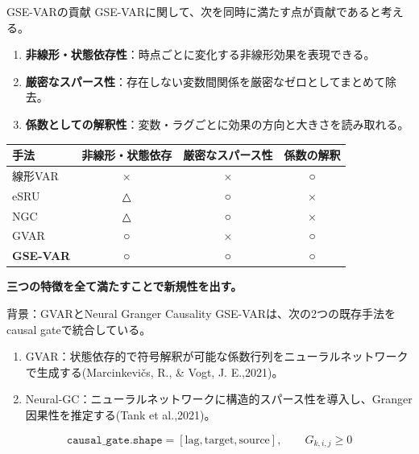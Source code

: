 \documentclass[dvipdfmx,11pt]{beamer}
\begin{document}
\begin{frame}{GSE-VARの貢献}
  \small
  GSE-VARに関して、次を同時に満たす点が貢献であると考える。

  \vspace{0.4em}
  \begin{enumerate}
    \item \textbf{非線形・状態依存性}：時点ごとに変化する非線形効果を表現できる。
    \item \textbf{厳密なスパース性}：存在しない変数間関係を厳密なゼロとしてまとめて除去。
    \item \textbf{係数としての解釈性}：変数・ラグごとに効果の方向と大きさを読み取れる。
  \end{enumerate}

  \vspace{0.5em}
  \scriptsize
  \setlength{\tabcolsep}{4pt}
  \renewcommand{\arraystretch}{1.25}
  \center
  \begin{tabular}{@{}lccc@{}}
    \toprule
    手法 & 非線形・状態依存 & 厳密なスパース性 & 係数の解釈 \\
    \midrule
    線形VAR & × & × & ○ \\
    eSRU & △ & ○ & × \\
    NGC & △ & ○ & ×\\
    GVAR & ○ & × & ○ \\
    \textbf{GSE-VAR} & \textbf{○} & \textbf{○} & \textbf{○} \\
    \bottomrule
  \end{tabular}

  \vspace{0.6em}
  \normalsize
\textbf{三つの特徴を全て満たすことで新規性を出す。}
\end{frame}


\begin{frame}{背景：GVARとNeural Granger Causality}
  GSE-VARは、次の2つの既存手法をcausal gateで統合している。

  \begin{enumerate}
    \item GVAR：状態依存的で符号解釈が可能な係数行列をニューラルネットワークで生成する(Marcinkevičs, R., \& Vogt, J. E.,2021)。
    \item Neural-GC：ニューラルネットワークに構造的スパース性を導入し、Granger因果性を推定する(Tank et al.,2021)。
  \end{enumerate}

  \vspace{0.5em}

  \[
    \texttt{causal\_gate.shape} = [\text{lag}, \text{target}, \text{source}],
    \qquad
    G_{k,i,j}\geq 0
  \]

\end{frame}
\end{document}
